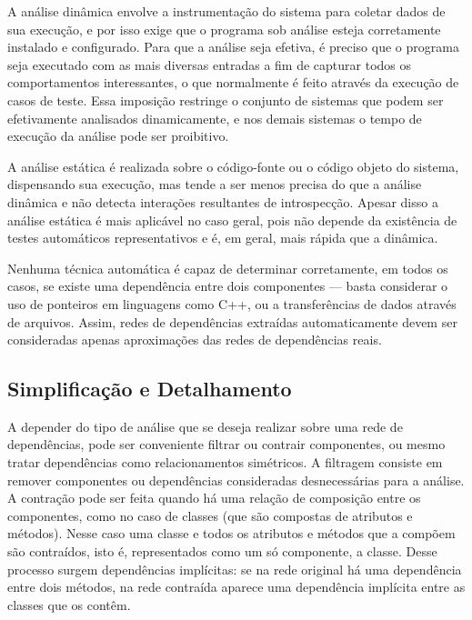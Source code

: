\documentclass{article}
\begin{document}
A análise dinâmica envolve a instrumentação do sistema para coletar dados de sua execução, e por isso exige que o programa sob análise esteja corretamente instalado e configurado. Para que a análise seja efetiva, é preciso que o programa seja executado com as mais diversas entradas a fim de capturar todos os comportamentos interessantes, o que normalmente é feito através da execução de casos de teste. Essa imposição restringe o conjunto de sistemas que podem ser efetivamente analisados dinamicamente, e nos demais sistemas o tempo de execução da análise pode ser proibitivo.

A análise estática é realizada sobre o código-fonte ou o código objeto do sistema, dispensando sua execução, mas tende a ser menos precisa do que a análise dinâmica e não detecta interações resultantes de introspecção. Apesar disso a análise estática é mais aplicável no caso geral, pois não depende da existência de testes automáticos representativos e é, em geral, mais rápida que a dinâmica.

Nenhuma técnica automática é capaz de determinar corretamente, em todos os casos, se existe uma dependência entre dois componentes --- basta considerar o uso de ponteiros em linguagens como C++, ou a transferências de dados através de arquivos. Assim, redes de dependências extraídas automaticamente devem ser consideradas apenas aproximações das redes de dependências reais.

\subsection{Simplificação e Detalhamento}

A depender do tipo de análise que se deseja realizar sobre uma rede de dependências, pode ser conveniente filtrar ou contrair componentes, ou mesmo tratar dependências como relacionamentos simétricos. A filtragem consiste em remover componentes ou dependências consideradas desnecessárias para a análise. A contração pode ser feita quando há uma relação de composição entre os componentes, como no caso de classes (que são compostas de atributos e métodos). Nesse caso uma classe e todos os atributos e métodos que a compõem são contraídos, isto é, representados como um só componente, a classe. Desse processo surgem dependências implícitas: se na rede original há uma dependência entre dois métodos, na rede contraída aparece uma dependência implícita entre as classes que os contêm. %
\end{document}
